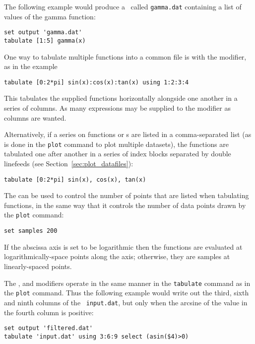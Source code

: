 The following example would produce a \datafile\ called {\tt gamma.dat}
containing a list of values of the gamma function:

\begin{verbatim}
set output 'gamma.dat'
tabulate [1:5] gamma(x)
\end{verbatim}

One way to tabulate multiple functions into a common file is with the
 modifier, as in the example

\begin{verbatim}
tabulate [0:2*pi] sin(x):cos(x):tan(x) using 1:2:3:4
\end{verbatim}

\noindent This tabulates the supplied functions horizontally alongside one
another in a series of columns. As many expressions may be supplied to the
 modifier as columns are wanted.

Alternatively, if a series on functions or \datafile s are listed in a
comma-separated list (as is done in the {\tt plot} command to plot multiple
datasets), the functions are tabulated one after another in a series of index
blocks separated by double linefeeds (see Section~\ref{sec:plot_datafiles}):

\begin{verbatim}
tabulate [0:2*pi] sin(x), cos(x), tan(x)
\end{verbatim}

The  can be used to control the number of points that are
listed when tabulating functions, in the same way that it controls the number
of data points drawn by the {\tt plot} command:

\begin{verbatim}
set samples 200
\end{verbatim}

\noindent If the abscissa axis is set to be logarithmic then the functions are
evaluated at logarithmically-space points along the axis; otherwise, they are
samples at linearly-spaced points.

The ,  and  modifiers operate in
the same manner in the {\tt tabulate} command as in the {\tt plot} command.
Thus the following example would write out the third, sixth and ninth columns
of the \datafile\ {\tt input.dat}, but only when the arcsine of the value in the
fourth column is positive:

\begin{verbatim}
set output 'filtered.dat'
tabulate 'input.dat' using 3:6:9 select (asin($4)>0)
\end{verbatim}

